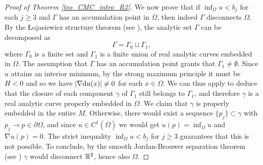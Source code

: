 \documentclass[10 pt,a4paper]{article}
\theoremstyle{definition}
\begin{document}
\begin{proof}[Proof of Theorem \ref{teo_CMC_intro_R2}]
	We now prove that if $\inf_\Omega u < b_j$ for each $j\geq 3$ and $\Gamma$ has an accumulation point in $\overline{\Omega}$, then indeed $\Gamma$ disconnects $\Omega$. %
	By the \L ojasiewicz structure theorem (see \cite{KP}), the analytic set $\Gamma$ %
	can be decomposed as
	\[
		\Gamma = \Gamma_0\sqcup\Gamma_1,
	\]
	where $\Gamma_0$ is a finite set and $\Gamma_1$ is a finite union of real analytic curves embedded in $\Omega$. The assumption that $\Gamma$ has an accumulation point grants that $\Gamma_1\neq\emptyset$. Since $u$ attains an interior minimum, by the strong maximum principle it must be $H < 0$ and so we have $|\nabla \mathrm{d} u(x)|\neq 0$ for each $x \in \Omega$. We can thus apply \cite[Corollary 3.4]{BCM} to deduce that the closure of each component $\gamma$ of $\Gamma_1$ still belongs to $\Gamma_1$, and therefore $\gamma$ is a real analytic curve properly embedded in $\Omega$. We claim that $\gamma$ is properly embedded in the entire $M$. Otherwise, there would exist a sequence $\{p_j\} \subset \gamma$ with $p_j \to p \in \partial \Omega$, and since $u \in C^1(\overline\Omega)$ we would get $u(p) = \inf_\Omega u$ and $\nabla u(p) = 0$. The strict inequality $\inf_\Omega u < b_j$ for $j \ge 3$ guarantees that this is not possible. To conclude, by the smooth Jordan-Brouwer separation theorem (see \cite{Lima}) $\gamma$ would disconnect $\mathbb R^2$, hence also $\Omega$.
%

\end{proof}
\end{document}
